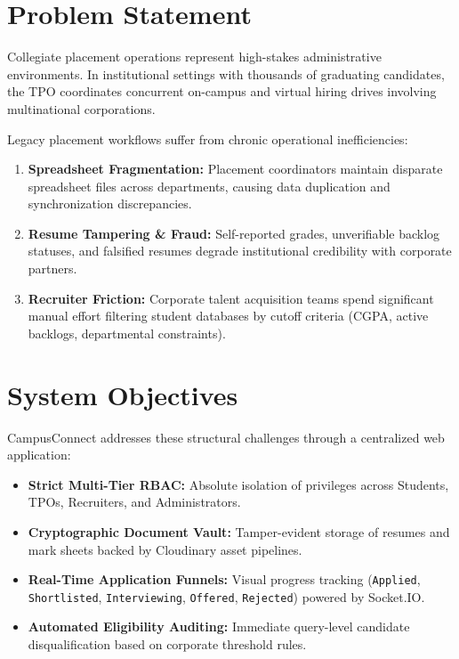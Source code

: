 \documentclass[12pt,a4paper]{report}
\begin{document}
\section{Problem Statement}
Collegiate placement operations represent high-stakes administrative environments. In institutional settings with thousands of graduating candidates, the TPO coordinates concurrent on-campus and virtual hiring drives involving multinational corporations.

Legacy placement workflows suffer from chronic operational inefficiencies:
\begin{enumerate}
    \item \textbf{Spreadsheet Fragmentation:} Placement coordinators maintain disparate spreadsheet files across departments, causing data duplication and synchronization discrepancies.
    \item \textbf{Resume Tampering \& Fraud:} Self-reported grades, unverifiable backlog statuses, and falsified resumes degrade institutional credibility with corporate partners.
    \item \textbf{Recruiter Friction:} Corporate talent acquisition teams spend significant manual effort filtering student databases by cutoff criteria (CGPA, active backlogs, departmental constraints).
\end{enumerate}

\section{System Objectives}
CampusConnect addresses these structural challenges through a centralized web application:
\begin{itemize}
    \item \textbf{Strict Multi-Tier RBAC:} Absolute isolation of privileges across Students, TPOs, Recruiters, and Administrators.
    \item \textbf{Cryptographic Document Vault:} Tamper-evident storage of resumes and mark sheets backed by Cloudinary asset pipelines.
    \item \textbf{Real-Time Application Funnels:} Visual progress tracking (\texttt{Applied}, \texttt{Shortlisted}, \texttt{Interviewing}, \texttt{Offered}, \texttt{Rejected}) powered by Socket.IO.
    \item \textbf{Automated Eligibility Auditing:} Immediate query-level candidate disqualification based on corporate threshold rules.
\end{itemize}

\end{document}
